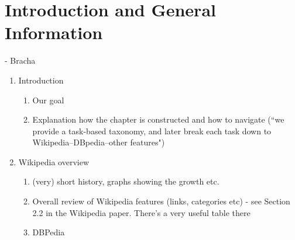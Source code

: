 \chapter{Introduction and General Information} - Bracha


\begin{enumerate}
	\item Introduction
	\begin{enumerate}
		\item Our goal
		\item Explanation how the chapter is constructed and how to navigate (``we provide a task-based taxonomy, and later break each task down to Wikipedia--DBpedia--other features")
	\end{enumerate}
	\item Wikipedia overview
	\begin{enumerate}
		\item (very) short history, graphs showing the growth etc.
		\item Overall review of Wikipedia features (links, categories etc) - see Section 2.2 in the Wikipedia paper. There’s a very useful table there
		\item DBPedia 
	\end{enumerate}
\end{enumerate}
